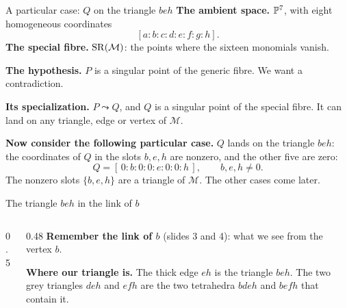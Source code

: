 \begin{frame}{A particular case: \(Q\) on the triangle \(beh\)}
\textbf{The ambient space.} \(\mathbb P^7\), with eight homogeneous coordinates
\[
[a:b:c:d:e:f:g:h].
\]
\textbf{The special fibre.} \(\operatorname{SR}(\mathcal M)\): the points where the sixteen monomials vanish.
\par\medskip
\textbf{The hypothesis.} \(P\) is a singular point of the generic fibre. We want a contradiction.
\par\medskip
\textbf{Its specialization.} \(P\leadsto Q\), and \(Q\) is a singular point of the special fibre. It can land on any triangle, edge or vertex of \(\mathcal M\).
\par\medskip
\textbf{Now consider the following particular case.} \(Q\) lands on the triangle \(beh\): the coordinates of \(Q\) in the slots \(b,e,h\) are nonzero, and the other five are zero:
\[
\boxed{Q=[\,0:b:0:0:e:0:0:h\,],\qquad b,e,h\ne0.}
\]
The nonzero slots \(\{b,e,h\}\) are a triangle of \(\mathcal M\). The other cases come later.
\end{frame}


\begin{frame}{The triangle \(beh\) in the link of \(b\)}
\begin{columns}[c]
\begin{column}{0.5\textwidth}
\centering
{}
\end{column}
\begin{column}{0.48\textwidth}
\textbf{Remember the link of \(b\)} (slides 3 and 4): what we see from the vertex \(b\).
\par\medskip
\textbf{Where our triangle is.} The thick edge \(eh\) is the triangle \(beh\). The two grey triangles \(deh\) and \(efh\) are the two tetrahedra \(bdeh\) and \(befh\) that contain it.
\end{column}
\end{columns}
\end{frame}

